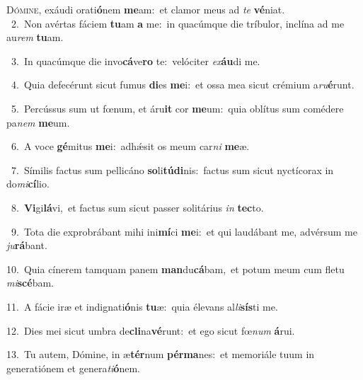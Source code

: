 \lettrine{\initial\textcolor{\initialcolor}{D}}{ómine,} exáudi orati\-\textbf{ó}\-nem \textbf{me}\-am:~\star et clamor meus ad \textit{te} \textbf{vé}\-niat.\\
{\numbfont\textcolor{\numbcolor}{~2.}}~Non avértas fáciem \textbf{tu}\-am \textbf{a} me:~\star in quacúmque die tríbulor, inclína ad me au\textit{rem} \textbf{tu}\-am.\par
{\numbfont\textcolor{\numbcolor}{~3.}}~In quacúmque die invo\-\textbf{cá}\-ve\textbf{ro} te:~\star velóciter \textit{ex}\-\textbf{áu}di me.\par
{\numbfont\textcolor{\numbcolor}{~4.}}~Quia defecérunt sicut fumus \textbf{di}\-es \textbf{me}\-i:~\star et ossa mea sicut crémium a\-\textit{ru}\-\textbf{é}runt.\par
{\numbfont\textcolor{\numbcolor}{~5.}}~Percússus sum ut fœnum, et áru\textbf{it} cor \textbf{me}\-um:~\star quia oblítus sum comédere pa\textit{nem} \textbf{me}\-um.\par
{\numbfont\textcolor{\numbcolor}{~6.}}~A voce \textbf{gé}\-mitus \textbf{me}\-i:~\star adhǽsit os meum car\textit{ni} \textbf{me}\-æ.\par
{\numbfont\textcolor{\numbcolor}{~7.}}~Símilis factus sum pellicáno \textbf{so}\-li\-\textbf{tú}\-\textbf{di}nis:~\star factus sum sicut nyctícorax in do\-\textit{mi}\-\textbf{cí}lio.\par
{\numbfont\textcolor{\numbcolor}{~8.}}~\-\textbf{Vi}\-gi\-\textbf{lá}\-vi,~\star et factus sum sicut passer solitárius \textit{in} \textbf{tec}\-to.\par
{\numbfont\textcolor{\numbcolor}{~9.}}~Tota die exprobrábant mihi ini\-\textbf{mí}\-ci \textbf{me}\-i:~\star et qui laudábant me, advérsum me \textit{ju}\-\textbf{rá}bant.\par
{\numbfont\textcolor{\numbcolor}{10.}}~Quia cínerem tamquam panem \textbf{man}\-du\-\textbf{cá}\-bam,~\star et potum meum cum fletu \textit{mi}\-\textbf{scé}bam.\par
{\numbfont\textcolor{\numbcolor}{11.}}~A fácie iræ et indignati\-\textbf{ó}\-nis \textbf{tu}\-æ:~\star quia élevans al\-\textit{li}\-\textbf{sís}ti me.\par
{\numbfont\textcolor{\numbcolor}{12.}}~Dies mei sicut umbra de\-\textbf{cli}\-na\-\textbf{vé}\-runt:~\star et ego sicut fœ\textit{num} \textbf{á}\-rui.\par
{\numbfont\textcolor{\numbcolor}{13.}}~Tu autem, Dómine, in æ\-\textbf{tér}\-num \textbf{pér}\-\textbf{ma}nes:~\star et memoriále tuum in generatiónem et genera\-\textit{ti}\-\textbf{ó}nem.\par

